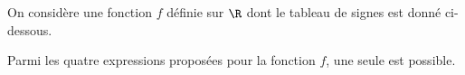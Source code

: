 
On considère une fonction $f$ définie sur $\R$ dont le tableau de signes est donné ci-dessous.

\begin{Centrage}
\end{Centrage}

Parmi les quatre expressions proposées pour la fonction $f$, une seule est possible.

\smallskip

